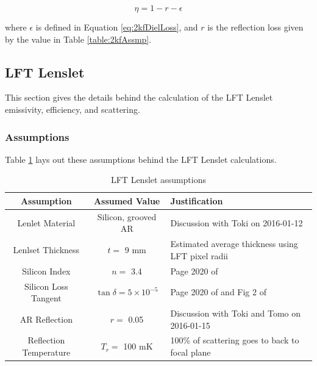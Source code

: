 \documentclass[12pt, titlepage]{article} %
\begin{document}
\begin{equation}
	\eta = 1 - r - \epsilon
\end{equation}

where $\epsilon$ is defined in Equation \ref{eq:2kfDielLoss}, and $r$ is the reflection loss given by the value in Table \ref{table:2kfAssmp}.


\subsection{LFT Lenslet}

This section gives the details behind the calculation of the LFT Lenslet emissivity, efficiency, and scattering.


\subsubsection{Assumptions}

Table \ref{table:lftLensletAssmp} lays out these assumptions behind the LFT Lenslet calculations.

\begin{table}[H]
	\centering
	\begin{tabularx}{\textwidth}{|| c | c | X ||}
	\hline
	Assumption & Assumed Value & Justification \\
	\hline
	\hline
	Lenlet Material & Silicon, grooved AR & Discussion with Toki on 2016-01-12 \\
	\hline
	Lenlset Thickness & $t =$ 9 mm & Estimated average thickness using LFT pixel radii \\
	\hline
	Silicon Index & $n =$ 3.4 & Page 2020 of \cite{lamb} \\
	\hline
	Silicon Loss Tangent & $\tan{\delta} = \mathrm{5 \times 10^{-5}}$ & Page 2020 of \cite{lamb} and Fig 2 of \cite{parshin} \\
	\hline
	AR Reflection & $r =$ 0.05 & Discussion with Toki and Tomo on 2016-01-15 \\
	\hline
	Reflection Temperature & $T_{r} =$ 100 mK & 100\% of scattering goes to back to focal plane \\
	\hline
	\end{tabularx}
\caption{LFT Lenslet assumptions \label{table:lftLensletAssmp}}
\end{table}

\end{document}
